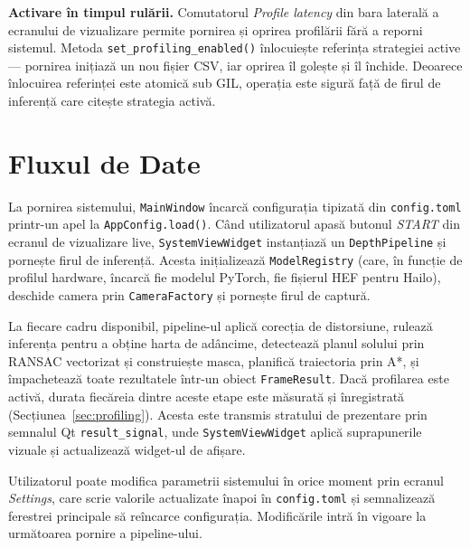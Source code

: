 \textbf{Activare în timpul rulării.} Comutatorul \textit{Profile latency} din bara laterală a ecranului de vizualizare permite pornirea și oprirea profilării fără a reporni sistemul. Metoda \texttt{set\_profiling\_enabled()} înlocuiește referința strategiei active — pornirea inițiază un nou fișier CSV, iar oprirea îl golește și îl închide. Deoarece înlocuirea referinței este atomică sub GIL, operația este sigură față de firul de inferență care citește strategia activă.

\section{Fluxul de Date}

La pornirea sistemului, \texttt{MainWindow} încarcă configurația tipizată din \texttt{config.toml} printr-un apel la \texttt{AppConfig.load()}. Când utilizatorul apasă butonul \textit{START} din ecranul de vizualizare live, \texttt{SystemViewWidget} instanțiază un \texttt{DepthPipeline} și pornește firul de inferență. Acesta inițializează \texttt{ModelRegistry} (care, în funcție de profilul hardware, încarcă fie modelul PyTorch, fie fișierul HEF pentru Hailo), deschide camera prin \texttt{CameraFactory} și pornește firul de captură.

La fiecare cadru disponibil, pipeline-ul aplică corecția de distorsiune, rulează inferența pentru a obține harta de adâncime, detectează planul solului prin RANSAC vectorizat și construiește masca, planifică traiectoria prin A*, și împachetează toate rezultatele într-un obiect \texttt{FrameResult}. Dacă profilarea este activă, durata fiecăreia dintre aceste etape este măsurată și înregistrată (Secțiunea~\ref{sec:profiling}). Acesta este transmis stratului de prezentare prin semnalul Qt \texttt{result\_signal}, unde \texttt{SystemViewWidget} aplică suprapunerile vizuale și actualizează widget-ul de afișare.

Utilizatorul poate modifica parametrii sistemului în orice moment prin ecranul \textit{Settings}, care scrie valorile actualizate înapoi în \texttt{config.toml} și semnalizează ferestrei principale să reîncarce configurația. Modificările intră în vigoare la următoarea pornire a pipeline-ului.
